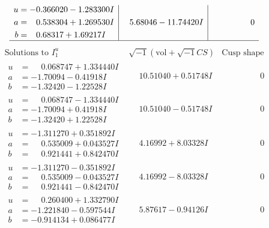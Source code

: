 \documentclass[1p]{elsarticle_modified}
\theoremstyle{definition}
\newcommand{\I}{\sqrt{-1}}
\begin{document}
$$\begin{array}{c|c|c}
\begin{aligned}
u &= -0.366020 - 1.283300 I \\
a &= \phantom{-}0.538304 + 1.269530 I \\
b &= \phantom{-}0.68317 + 1.69217 I\end{aligned}
 & \phantom{-}5.68046 - 11.74420 I & \phantom{-0.000000 } 0\\
 \hline 
 \end{array}$$\newpage$$\begin{array}{c|c|c}  
\text{Solutions to }I^u_{1}& \I (\text{vol} + \sqrt{-1}CS) & \text{Cusp shape}\\
 \hline 
\begin{aligned}
u &= \phantom{-}0.068747 + 1.334440 I \\
a &= -1.70094 - 0.41918 I \\
b &= -1.32420 - 1.22528 I\end{aligned}
 & \phantom{-}10.51040 + 0.51748 I & \phantom{-0.000000 } 0 \\ \hline\begin{aligned}
u &= \phantom{-}0.068747 - 1.334440 I \\
a &= -1.70094 + 0.41918 I \\
b &= -1.32420 + 1.22528 I\end{aligned}
 & \phantom{-}10.51040 - 0.51748 I & \phantom{-0.000000 } 0 \\ \hline\begin{aligned}
u &= -1.311270 + 0.351892 I \\
a &= \phantom{-}0.535009 + 0.043527 I \\
b &= \phantom{-}0.921441 + 0.842470 I\end{aligned}
 & \phantom{-}4.16992 + 8.03328 I & \phantom{-0.000000 } 0 \\ \hline\begin{aligned}
u &= -1.311270 - 0.351892 I \\
a &= \phantom{-}0.535009 - 0.043527 I \\
b &= \phantom{-}0.921441 - 0.842470 I\end{aligned}
 & \phantom{-}4.16992 - 8.03328 I & \phantom{-0.000000 } 0 \\ \hline\begin{aligned}
u &= \phantom{-}0.260400 + 1.332790 I \\
a &= -1.221840 - 0.597544 I \\
b &= -0.914134 + 0.086477 I\end{aligned}
 & \phantom{-}5.87617 - 0.94126 I & \phantom{-0.000000 } 0 \\ \hline\begin{aligned}

\end{aligned}
\end{array}$$
\end{document}
